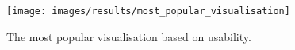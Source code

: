 
\begin{figure}[H]
	\centering
    \texttt{[image: images/results/most\_popular\_visualisation]}
    \caption{The most popular visualisation based on usability.}
    \label{fig:most_popular_visualisation}
\end{figure}
